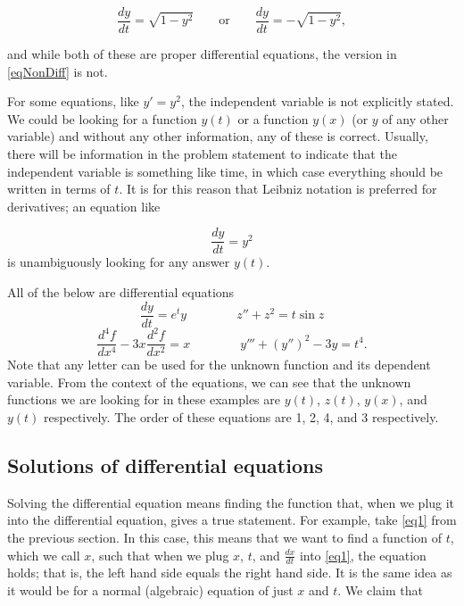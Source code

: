 \documentclass{ximera}
\begin{document}
\[ 
    \frac{dy}{dt} = \sqrt{1 - y^2} \qquad \text{or} \qquad \frac{dy}{dt} = -\sqrt{1 - y^2}, 
\] 

and while both of these are proper differential equations, the version in \eqref{eqNonDiff} is not.   

For some equations, like $y' = y^2$, the independent variable is not explicitly stated. We could be looking for a function $y(t)$ or a function $y(x)$ (or $y$ of any other variable) and without any other information, any of these is correct. Usually, there will be information in the problem statement to indicate that the independent variable is something like time, in which case everything should be written in terms of $t$. It is for this reason that Leibniz notation is preferred for derivatives; an equation like

\[ 
    \frac{dy}{dt} = y^2 
\] 
is unambiguously looking for any answer $y(t)$.

\begin{example}
    All of the below are differential equations
    \begin{equation*}
        \frac{dy}{dt} = e^t y \qquad \qquad z'' + z^2 = t\sin{z}
    \end{equation*}
    \begin{equation*}
        \frac{d^4f}{dx^4} - 3x \frac{d^2f}{dx^2} = x \qquad \qquad y''' + (y'')^2 - 3y = t^4.
    \end{equation*}
    Note that any letter can be used for the unknown function and its dependent variable. From the context of the equations, we can see that the unknown functions we are looking for in these examples are $y(t)$, $z(t)$, $y(x)$, and $y(t)$ respectively. The order of these equations are 1, 2, 4, and 3 respectively. 
\end{example}


\subsection{Solutions of differential equations}

Solving the differential equation means finding the function that, when we plug it into the differential equation, gives a true statement. For example, take \eqref{eq1} from the previous section. In this case, this means that we want to find a function of $t$, which we call $x$, such that when we plug $x$, $t$, and $\frac{dx}{dt}$ into \eqref{eq1}, the equation holds; that is, the left hand side equals the right hand side. It is the same idea as it would be for a normal (algebraic) equation of just $x$ and $t$.  We claim that
\end{document}

